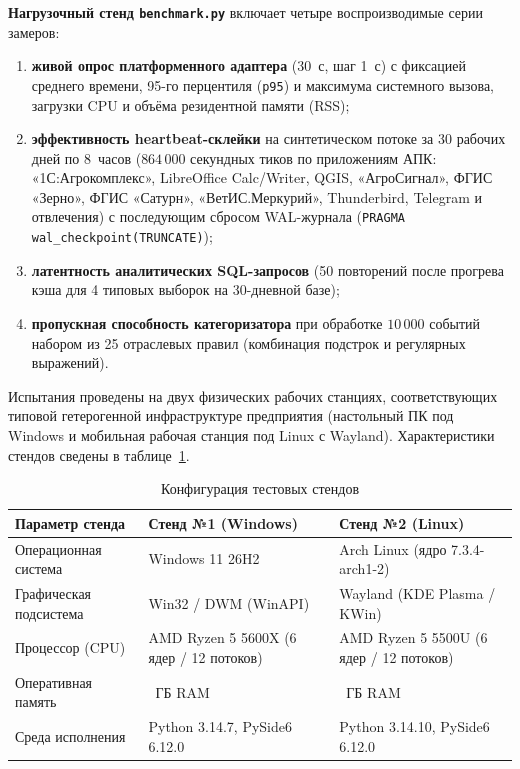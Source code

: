 \documentclass{timcw}
\begin{document}
\textbf{Нагрузочный стенд \texttt{benchmark.py}} включает четыре воспроизводимые серии замеров:
\begin{enumerate}
  \item \textbf{живой опрос платформенного адаптера} (30~с, шаг 1~с) с фиксацией среднего времени, 95-го перцентиля (\texttt{p95}) и максимума системного вызова, загрузки CPU и объёма резидентной памяти (RSS);
  \item \textbf{эффективность heartbeat-склейки} на синтетическом потоке за 30 рабочих дней по 8~часов ($864\,000$ секундных тиков по приложениям АПК: «1С:Агрокомплекс», LibreOffice Calc/Writer, QGIS, «АгроСигнал», ФГИС «Зерно», ФГИС «Сатурн», «ВетИС.Меркурий», Thunderbird, Telegram и отвлечения) с последующим сбросом WAL-журнала (\texttt{PRAGMA wal\_checkpoint(TRUNCATE)});
  \item \textbf{латентность аналитических SQL-запросов} (50 повторений после прогрева кэша для 4 типовых выборок на 30-дневной базе);
  \item \textbf{пропускная способность категоризатора} при обработке $10\,000$ событий набором из 25 отраслевых правил (комбинация подстрок и регулярных выражений).
\end{enumerate}

Испытания проведены на двух физических рабочих станциях, соответствующих типовой гетерогенной инфраструктуре предприятия (настольный ПК под Windows и мобильная рабочая станция под Linux с Wayland). Характеристики стендов сведены в таблице~\ref{tab:testbeds}.

\begin{table}[H]
\centering
\caption{Конфигурация тестовых стендов}
\label{tab:testbeds}
\footnotesize
\begin{tabularx}{\textwidth}{>{\raggedright\arraybackslash}p{4.0cm} >{\raggedright\arraybackslash}X >{\raggedright\arraybackslash}X}
\toprule
\textbf{Параметр стенда} & \textbf{Стенд №1 (Windows)} & \textbf{Стенд №2 (Linux)} \\
\midrule
Операционная система & Windows 11 26H2 & Arch Linux (ядро 7.3.4-arch1-2) \\
Графическая подсистема & Win32 / DWM (WinAPI) & Wayland (KDE Plasma / KWin) \\
Процессор (CPU) & AMD Ryzen 5 5600X (6 ядер / 12 потоков) & AMD Ryzen 5 5500U (6 ядер / 12 потоков) \\
Оперативная память & 16~ГБ RAM & 16~ГБ RAM \\
Среда исполнения & Python 3.14.7, PySide6 6.12.0 & Python 3.14.10, PySide6 6.12.0 \\
\bottomrule
\end{tabularx}
\end{table}
\end{document}
